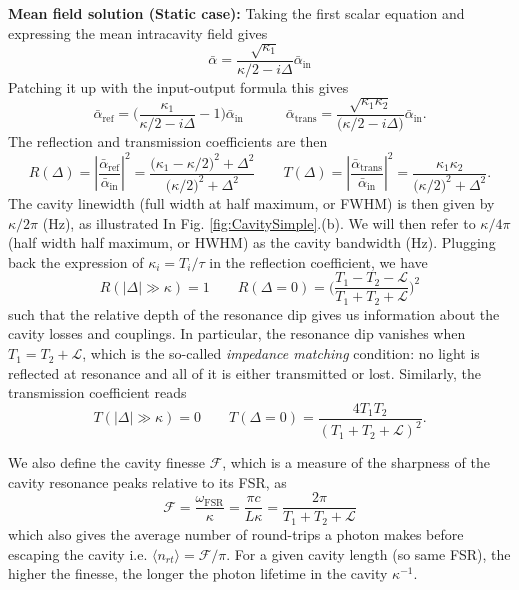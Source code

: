 \noindent \textbf{Mean field solution (Static case): }Taking the first scalar equation and expressing the mean intracavity field gives 
\begin{equation}
  \bar{\alpha} =  \frac{\sqrt{\kappa_1}}{\kappa/2-i\Delta}  \bar{\alpha}_{\mathrm{in}} 
\end{equation}
Patching it up with the input-output formula this gives 
\begin{equation}
  \bar{\alpha}_{\mathrm{ref}} =  \Bigg( \frac{\kappa_1}{\kappa/2-i\Delta} - 1 \Bigg)  \bar{\alpha}_{\mathrm{in}}   \quad \quad \quad  \bar{\alpha}_{\mathrm{trans}} =  \frac{\sqrt{\kappa_1 \kappa_2}}{\Big(\kappa/2-i\Delta\Big)} \bar{\alpha}_{\mathrm{in}}.
\end{equation}
The reflection and transmission coefficients are then
\begin{equation}
R(\Delta) = \left|\frac{\bar{\alpha}_{\mathrm{ref}}}{\bar{\alpha}_{\mathrm{in}}}\right|^2
= \frac{\bigl(\kappa_1-\kappa/2\bigr)^2+\Delta^2}{\bigl(\kappa/2)^2+\Delta^2} \quad \quad
T(\Delta) = \left|\frac{\bar{\alpha}_{\mathrm{trans}}}{\bar{\alpha}_{\mathrm{in}}}\right|^2
= \frac{\kappa_1\kappa_2}{\bigl(\kappa/2\bigr)^2+\Delta^2}.
\end{equation}
The cavity linewidth (full width at half maximum, or FWHM) is then given by $\kappa/2\pi$ (Hz), as illustrated In Fig. \ref{fig:CavitySimple}.(b). We will then refer to $\kappa/4\pi$ (half width half maximum, or HWHM) as the cavity bandwidth (Hz). Plugging back the expression of $\kappa_i = T_i/\tau$ in the reflection coefficient, we have 
\begin{equation}
  R(|\Delta| \gg \kappa) = 1  \qquad R(\Delta =0) = \Bigg(\frac{T_1 - T_2 - \mathcal{L}}{T_1 + T_2 + \mathcal{L}}\Bigg)^2
\end{equation}
such that the relative depth of the resonance dip gives us information about the cavity losses and couplings. In particular, the resonance dip vanishes when $T_1 = T_2 + \mathcal{L}$, which is the so-called \textit{impedance matching} condition: no light is reflected at resonance and all of it is either transmitted or lost. Similarly, the transmission coefficient reads
\begin{equation}
  T(|\Delta| \gg \kappa) = 0  \qquad T(\Delta =0) = \frac{4 T_1 T_2}{(T_1 + T_2 + \mathcal{L})^2}.
\end{equation}

We also define the cavity finesse $\mathcal{F}$, which is a measure of the sharpness of the cavity resonance peaks relative to its FSR, as
\begin{equation}
  \mathcal{F} = \frac{\omega_{\mathrm{FSR}}}{\kappa} = \frac{\pi c}{L \kappa} = \frac{2\pi}{T_1 + T_2 + \mathcal{L}}
\end{equation}
which also gives the average number of round-trips a photon makes before escaping the cavity i.e. $\langle n_{rt} \rangle = \mathcal{F}/\pi$. For a given cavity length (so same FSR), the higher the finesse, the longer the photon lifetime in the cavity $\kappa^{-1}$. \\

